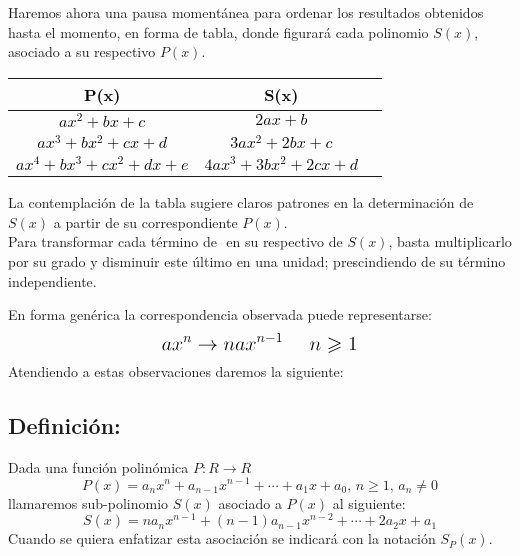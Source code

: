 \documentclass[12pt]{article}
\begin{document}
Haremos ahora una pausa momentánea para ordenar los resultados obtenidos hasta el momento, en forma de tabla, donde figurará cada polinomio $S(x)$, asociado a su respectivo $P(x)$.
\textcolor{red}{
  \begin{center}
    \begin{tabular}{ |c|c|c| }
      \hline
      \textbf{\textcolor{black}{P(x)}}         & \textbf{\textcolor{black}{S(x)}}       \\
      \hline
      \textcolor{black}{$ax^2+bx+c$}           & \textcolor{black}{$2ax+b$}             \\
      \hline
      \textcolor{black}{$ax^3+bx^2+cx+d$}      & \textcolor{black}{$3ax^2+2bx+c$}       \\
      \hline
      \textcolor{black}{$ax^4+bx^3+cx^2+dx+e$} & \textcolor{black}{$4ax^3+3bx^2+2cx+d$} \\
      \hline
    \end{tabular}
  \end{center}
}


La contemplación de la tabla sugiere claros patrones en la determinación de $S(x)$ a partir de su correspondiente $P(x)$. \\
Para transformar cada término de $ $ en su respectivo de $S(x)$, basta multiplicarlo por su grado y disminuir este último en una unidad; prescindiendo de su término independiente.

En forma genérica la correspondencia observada puede representarse:
$$
  \text{\Large$
      ax^n \rightarrow nax^{n-1} \ \ \ \ n \geqslant 1
    $}
$$
Atendiendo a estas observaciones daremos la siguiente:

\subsection*{Definición:}
Dada una función polinómica $P:R \rightarrow R$
$$
  P(x)={a}_n x^n+{a}_{n-1} x^{n-1}+\cdots+{a}_1 x+{a}_0\text{, \ }n\geqslant1\text{, \ }{a}_n\neq0
$$
llamaremos sub-polinomio $S(x)$ asociado a $P(x)$ al siguiente:
$$
  S(x)=n{a}_{n}x^{n-1}+(n-1){a}_{n-1}x^{n-2}+\cdots+2{a}_2x+{a}_1
$$
Cuando se quiera enfatizar esta asociación se indicará con la notación ${S}_P(x)$.
\end{document}

